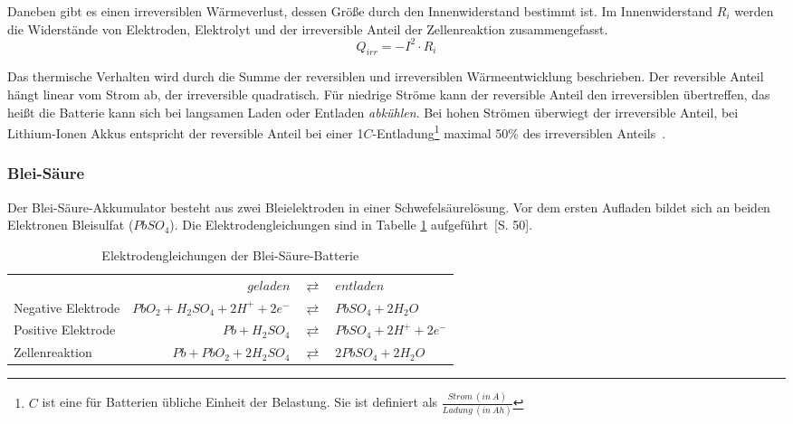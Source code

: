 Daneben gibt es einen irreversiblen Wärmeverlust, dessen Größe durch den Innenwiderstand bestimmt ist. Im Innenwiderstand $R_i$ werden die Widerstände von Elektroden, Elektrolyt und der irreversible Anteil der Zellenreaktion zusammengefasst.
\begin{equation}\label{gl_innenwiderstand}
Q_{irr}=-I^2\cdot R_i
\end{equation}

Das thermische Verhalten wird durch die Summe der reversiblen und irreversiblen Wärmeentwicklung beschrieben. Der reversible Anteil hängt linear vom Strom ab, der irreversible quadratisch. Für niedrige Ströme kann der reversible Anteil den irreversiblen übertreffen, das heißt die Batterie kann sich bei langsamen Laden oder Entladen \emph{abkühlen}. Bei hohen Strömen überwiegt der irreversible Anteil, bei Lithium-Ionen Akkus entspricht der reversible Anteil bei einer 1$C$-Entladung\footnote{$C$ ist eine für Batterien übliche Einheit der Belastung. Sie ist definiert als $\frac{Strom\ (in\ A)}{Ladung\ (in\ Ah)}$} maximal 50\% des irreversiblen Anteils~\cite{Viswanathan20103720}.


\subsubsection{Blei-Säure}
Der Blei-Säure-Akkumulator besteht aus zwei Bleielektroden in einer Schwefelsäurelösung. Vor dem ersten Aufladen bildet sich an beiden Elektronen Bleisulfat ($PbSO_4$). Die Elektrodengleichungen sind in Tabelle \ref{Pb} aufgeführt~\cite{KiehneBattery}[S. 50].

\begin{table}\centering
	\begin{tabularx}{\linewidth}{XrcX}
		\toprule
		&                       $geladen$ & $\rightleftarrows$ & $entladen$             \\
		Negative Elektrode & $PbO_2 + H_2SO_4 + 2H^+ + 2e^-$ & $\rightleftarrows$ & $PbSO_4 + 2H_2O$       \\
		Positive Elektrode &                $Pb + H_2SO_4$ & $\rightleftarrows$ & $PbSO_4 + 2H^+ + 2e^-$ \\ \midrule
		Zellenreaktion     &         $Pb + PbO_2 + 2H_2SO_4$ & $\rightleftarrows$ & $2PbSO_4 + 2H_2O$      \\ \bottomrule
	\end{tabularx}
	\caption{Elektrodengleichungen der Blei-Säure-Batterie}
	\label{Pb}
\end{table}

